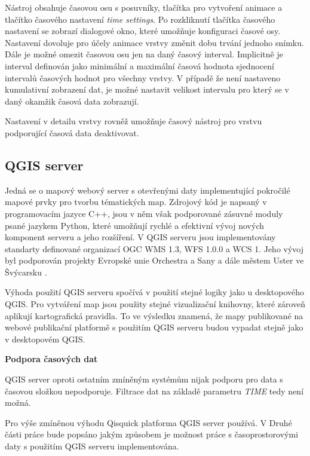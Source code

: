 Nástroj obsahuje časovou osu s posuvníky, tlačítka pro vytvoření animace a tlačítko časového nastavení \textit{time settings}. Po rozkliknutí tlačítka časového nastavení se zobrazí dialogové okno, které umožňuje konfiguraci časové osy. Nastavení dovoluje pro účely animace vrstvy změnit dobu trvání jednoho snímku. Dále je možné omezit časovou osu jen na daný časový interval. Implicitně je interval definován jako minimální a maximální časová hodnota sjednocení intervalů časových hodnot pro všechny vrstvy. V případě že není nastaveno kumulativní zobrazení dat, je možné nastavit velikost intervalu pro který se v daný okamžik časová data zobrazují.  

Nastavení v detailu vrstvy rovněž umožňuje časový nástroj pro vrstvu podporující časová data deaktivovat.

\newpage
\subsection{QGIS server}

Jedná se o mapový webový server s otevřenými daty implementující pokročilé mapové prvky pro tvorbu tématických map. Zdrojový kód je napsaný v programovacím jazyce C++, jsou v něm však podporované zásuvné moduly psané jazykem Python, které umožňují rychlé a efektivní vývoj nových komponent serveru a jeho rozšíření. V QGIS serveru jsou implementovány standarty definované organizací OGC WMS 1.3, WFS 1.0.0 a WCS 1. Jeho vývoj byl podporován projekty Evropské unie Orchestra a Sany a dále městem Uster ve Švýcarsku \cite{qgis-server}.

Výhoda použití QGIS serveru spočívá v použití stejné logiky jako u desktopového QGIS. Pro vytváření map jsou použity stejné vizualizační knihovny, které zároveň aplikují kartografická pravidla. To ve výsledku znamená, že mapy publikované na webové publikační platformě s použitím QGIS serveru budou vypadat stejně jako v desktopovém QGIS.

\bigskip
\noindent
\textbf{Podpora časových dat}

QGIS server oproti ostatním zmíněným systémům nijak podporu pro data s časovou složkou nepodporuje. Filtrace dat na základě parametru \textit{TIME} tedy není možná.

Pro výše zmíněnou výhodu Qisquick platforma QGIS server používá. V Druhé části práce bude popsáno jakým způsobem je možnost práce s časoprostorovými daty s použitím QGIS serveru implementována.


